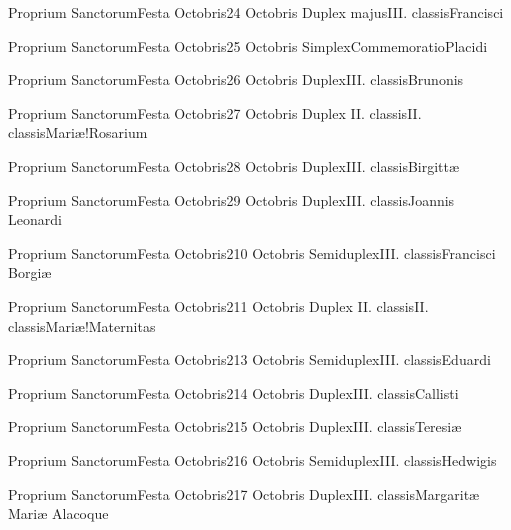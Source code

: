 \documentclass[invitatoriale-romanum.tex]{subfiles}
\begin{document}
	{Proprium Sanctorum}{Festa Octobris}{2}{4 Octobris}
	{Duplex majus}{III. classis}{Francisci}
	{}
	{}

	{Proprium Sanctorum}{Festa Octobris}{2}{5 Octobris}
	{Simplex}{Commemoratio}{Placidi}
	{}
	{\invitferia}

	{Proprium Sanctorum}{Festa Octobris}{2}{6 Octobris}
	{Duplex}{III. classis}{Brunonis}
	{}
	{}

	{Proprium Sanctorum}{Festa Octobris}{2}{7 Octobris}
	{Duplex II. classis}{II. classis}{Mariæ!Rosarium}
	{}
	{}

	{Proprium Sanctorum}{Festa Octobris}{2}{8 Octobris}
	{Duplex}{III. classis}{Birgittæ}
	{}
	{}

	{Proprium Sanctorum}{Festa Octobris}{2}{9 Octobris}
	{Duplex}{III. classis}{Joannis Leonardi}
	{}
	{}

	{Proprium Sanctorum}{Festa Octobris}{2}{10 Octobris}
	{Semiduplex}{III. classis}{Francisci Borgiæ}
	{}
	{}

	{Proprium Sanctorum}{Festa Octobris}{2}{11 Octobris}
	{Duplex II. classis}{II. classis}{Mariæ!Maternitas}
	{}
	{}

	{Proprium Sanctorum}{Festa Octobris}{2}{13 Octobris}
	{Semiduplex}{III. classis}{Eduardi}
	{}
	{}

	{Proprium Sanctorum}{Festa Octobris}{2}{14 Octobris}
	{Duplex}{III. classis}{Callisti}
	{}
	{}

	{Proprium Sanctorum}{Festa Octobris}{2}{15 Octobris}
	{Duplex}{III. classis}{Teresiæ}
	{}
	{}

	{Proprium Sanctorum}{Festa Octobris}{2}{16 Octobris}
	{Semiduplex}{III. classis}{Hedwigis}
	{}
	{}

	{Proprium Sanctorum}{Festa Octobris}{2}{17 Octobris}
	{Duplex}{III. classis}{Margaritæ Mariæ Alacoque}
	{}
	{}
\end{document}
